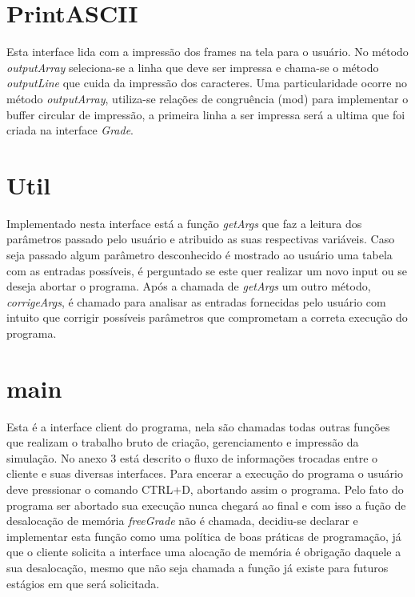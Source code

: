 \documentclass[a4paper,11pt]{article}
\begin{document}
\section{PrintASCII}
Esta interface lida com a impressão dos frames na tela para o usuário. No método \textit{outputArray} seleciona-se a linha que deve ser impressa e chama-se o método \textit{outputLine} que cuida da impressão dos caracteres. Uma particularidade ocorre no método \textit{outputArray}, utiliza-se rela\c{c}ões de congruência (mod) para implementar o buffer circular de impressão, a primeira linha a ser impressa será a ultima que foi criada na interface \textit{Grade}.

\section{Util}
Implementado nesta interface está a fun\c{c}ão \textit{getArgs} que faz a leitura dos parâmetros passado pelo usuário e atribuido as suas respectivas variáveis. Caso seja passado algum parâmetro desconhecido é mostrado ao usuário uma tabela com as entradas possíveis, é perguntado se este quer realizar um novo input ou se deseja abortar o programa. Após a chamada de \textit{getArgs} um outro método, 
\textit{corrigeArgs}, é chamado para analisar as entradas fornecidas pelo usuário com intuito que corrigir possíveis parâmetros que comprometam a correta execu\c{c}ão do programa.

\section{main}
Esta é a interface client do programa, nela são chamadas todas outras fun\c{c}ões que realizam o trabalho bruto de cria\c{c}ão, gerenciamento e impressão da simula\c{c}ão. No anexo 3 está descrito o fluxo de informa\c{c}ões trocadas entre o cliente e suas diversas interfaces. Para encerar a execu\c{c}ão do programa o usuário deve pressionar o comando CTRL+D, abortando assim o programa. Pelo fato do programa ser abortado sua execu\c{c}ão nunca chegará ao final e com isso a fu\c{c}ão de desaloca\c{c}ão de memória \textit{freeGrade} não é chamada, decidiu-se declarar e implementar esta fun\c{c}ão como uma política de boas práticas de programa\c{c}ão, já que o cliente solicita a interface uma aloca\c{c}ão de memória é obriga\c{c}ão daquele a sua desaloca\c{c}ão, mesmo que não seja chamada a fun\c{c}ão já existe para futuros estágios em que será solicitada.
\end{document}
